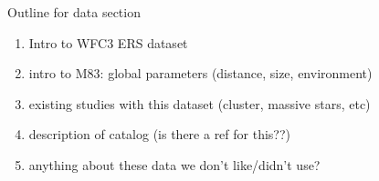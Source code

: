 Outline for data section

\begin{enumerate}
\item Intro to WFC3 ERS dataset
\item intro to M83: global parameters (distance, size, environment)
\item existing studies with this dataset (cluster, massive stars, etc)
\item description of catalog (is there a ref for this??)
\item anything about these data we don't like/didn't use?
\end{enumerate}
